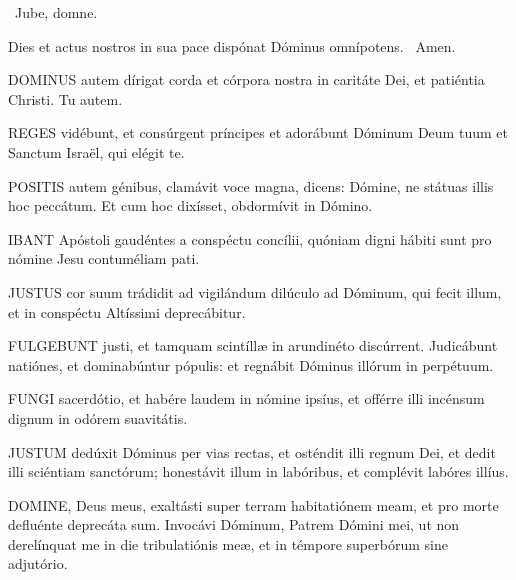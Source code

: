 \V\ Jube, domne.

 Dies et actus nostros in sua pace dispónat Dóminus omnípotens. \R\ Amen.


\lettrine[lines=2]{D}{OMINUS} autem dírigat corda et córpora nostra in caritáte Dei, et patiéntia Christi. Tu autem.



\lettrine[lines=2]{R}{EGES} vidébunt, et consúrgent príncipes et adorábunt Dóminum Deum tuum et Sanctum Israël, qui elégit te.


\lettrine[lines=2]{P}{OSITIS} autem génibus, clamávit voce magna, dicens: Dómine, ne státuas illis hoc peccátum. Et cum hoc dixísset, obdormívit in Dómino.



\lettrine[lines=2]{I}{BANT} Apóstoli gaudéntes a conspéctu concílii, quóniam digni hábiti sunt pro nómine Jesu contuméliam pati.


\lettrine[lines=2]{J}{USTUS} cor suum trádidit ad vigilándum dilúculo ad Dóminum, qui fecit illum, et in conspéctu Altíssimi deprecábitur.


\lettrine[lines=2]{F}{ULGEBUNT} justi, et tamquam scintíllæ in arundinéto discúrrent. Judicábunt natiónes, et dominabúntur pópulis: et regnábit Dóminus illórum in perpétuum.


\lettrine[lines=2]{F}{UNGI} sacerdótio, et habére laudem in nómine ipsíus, et offérre illi incénsum dignum in odórem suavitátis.


\lettrine[lines=2]{J}{USTUM} dedúxit Dóminus per vias rectas, et osténdit illi regnum Dei, et dedit illi sciéntiam sanctórum; honestávit illum in labóribus, et complévit labóres illíus.


\lettrine[lines=2]{D}{OMINE}, Deus meus, exaltásti super terram habitatiónem meam, et pro morte defluénte deprecáta sum. Invocávi Dóminum, Patrem Dómini mei, ut non derelínquat me in die tribulatiónis meæ, et in témpore superbórum sine adjutório.

